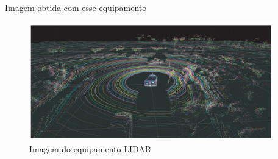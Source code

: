 \begin{enumerate}
Imagem obtida com esse equipamento

\begin{figure}[h]
  \centering
  \includegraphics[width=400px, scale=1]{figuras/img_lidar}
  \caption{Imagem do equipamento LIDAR}
\label{fig:img_lidar}
\end{figure}
\end{enumerate}
